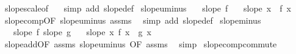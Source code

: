 \begin{isabellebody}
\isamarkupfalse%
\ slope{\isacharunderscore}{\kern0pt}scale{\isacharbrackleft}{\kern0pt}of\ {\isachardoublequoteopen}{\isacharminus}{\kern0pt}{}{\isachardoublequoteclose}{\isacharbrackright}{\kern0pt}\ \isamarkupfalse%
\ {\isacharparenleft}{\kern0pt}simp\ add{\isacharcolon}{\kern0pt}\ slope{\isacharunderscore}{\kern0pt}def{\isacharparenright}{\kern0pt}%
\endisatagproof
{\isafoldproof}%
%
\isadelimproof
%
\endisadelimproof
\isanewline
\isanewline
{}\isamarkupfalse%
\ slope{\isacharunderscore}{\kern0pt}uminus{\isacharprime}{\kern0pt}{\isacharcolon}{\kern0pt}\isanewline
\ \ \ {\isachardoublequoteopen}slope\ f{\isachardoublequoteclose}\isanewline
\ \ \ {\isachardoublequoteopen}slope\ {\isacharparenleft}{\kern0pt}{\isasymlambda}x{\isachardot}{\kern0pt}\ {\isacharminus}{\kern0pt}\ f\ x{\isacharparenright}{\kern0pt}{\isachardoublequoteclose}\isanewline
%
\isadelimproof
\ \ %
\endisadelimproof
%
\isatagproof
{}\isamarkupfalse%
\ slope{\isacharunderscore}{\kern0pt}comp{\isacharbrackleft}{\kern0pt}OF\ slope{\isacharunderscore}{\kern0pt}uminus\ assms{\isacharbrackright}{\kern0pt}\ \isamarkupfalse%
\ {\isacharparenleft}{\kern0pt}simp\ add{\isacharcolon}{\kern0pt}\ slope{\isacharunderscore}{\kern0pt}def{\isacharparenright}{\kern0pt}%
\endisatagproof
{\isafoldproof}%
%
\isadelimproof
\isanewline
%
\endisadelimproof
\isanewline
{}\isamarkupfalse%
\ slope{\isacharunderscore}{\kern0pt}minus{\isacharcolon}{\kern0pt}\isanewline
\ \ \ {\isachardoublequoteopen}slope\ f{\isachardoublequoteclose}\ {\isachardoublequoteopen}slope\ g{\isachardoublequoteclose}\isanewline
\ \ \ {\isachardoublequoteopen}slope\ {\isacharparenleft}{\kern0pt}{\isasymlambda}x{\isachardot}{\kern0pt}\ f\ x\ {\isacharminus}{\kern0pt}\ g\ x{\isacharparenright}{\kern0pt}{\isachardoublequoteclose}\isanewline
%
\isadelimproof
\ \ %
\endisadelimproof
%
\isatagproof
{}\isamarkupfalse%
\ slope{\isacharunderscore}{\kern0pt}add{\isacharbrackleft}{\kern0pt}OF\ assms{\isacharparenleft}{\kern0pt}{}{\isacharparenright}{\kern0pt}\ slope{\isacharunderscore}{\kern0pt}uminus{\isacharprime}{\kern0pt}{\isacharcomma}{\kern0pt}\ OF\ assms{\isacharparenleft}{\kern0pt}{}{\isacharparenright}{\kern0pt}{\isacharbrackright}{\kern0pt}\ \isamarkupfalse%
\ simp%
\endisatagproof
{\isafoldproof}%
%
\isadelimproof
\isanewline
%
\endisadelimproof
\isanewline
{}\isamarkupfalse%
\ slope{\isacharunderscore}{\kern0pt}comp{\isacharunderscore}{\kern0pt}commute{\isacharcolon}{\kern0pt}\isanewline

\end{isabellebody}
